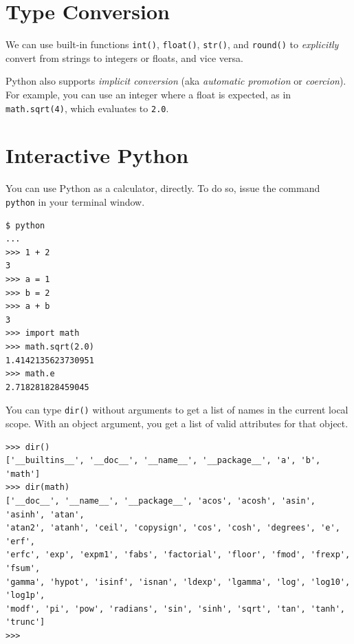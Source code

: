 \documentclass[8pt,a4paper,compress,handout]{beamer}
\begin{document}
\section{Type Conversion}
\begin{frame}[fragile]
We can use built-in functions \lstinline{int()}, \lstinline{float()}, \lstinline{str()}, and \lstinline{round()} to \emph{explicitly} convert from strings to integers or floats, and vice versa.

\bigskip

Python also supports \emph{implicit conversion} (aka \emph{automatic promotion} or \emph{coercion}). For example, you can use an integer where a float is expected, as in \lstinline{math.sqrt(4)}, which evaluates to \lstinline{2.0}.
\end{frame}

\section{Interactive Python}
\begin{frame}[fragile]
You can use Python as a calculator, directly. To do so, issue the command \lstinline{python} in your terminal window. 

\begin{lstlisting}[language={}]
$ python
...
>>> 1 + 2
3
>>> a = 1
>>> b = 2
>>> a + b
3
>>> import math
>>> math.sqrt(2.0)
1.4142135623730951
>>> math.e
2.718281828459045
\end{lstlisting}

\bigskip

You can type \lstinline{dir()} without arguments to get a list of names in the current local scope. With an object argument, you get a list of valid attributes for that object.
\begin{lstlisting}[language={}]
>>> dir()
['__builtins__', '__doc__', '__name__', '__package__', 'a', 'b', 'math']
>>> dir(math)
['__doc__', '__name__', '__package__', 'acos', 'acosh', 'asin', 'asinh', 'atan', 
'atan2', 'atanh', 'ceil', 'copysign', 'cos', 'cosh', 'degrees', 'e', 'erf', 
'erfc', 'exp', 'expm1', 'fabs', 'factorial', 'floor', 'fmod', 'frexp', 'fsum', 
'gamma', 'hypot', 'isinf', 'isnan', 'ldexp', 'lgamma', 'log', 'log10', 'log1p', 
'modf', 'pi', 'pow', 'radians', 'sin', 'sinh', 'sqrt', 'tan', 'tanh', 'trunc']
>>> 
\end{lstlisting}

\end{frame}
\end{document}

